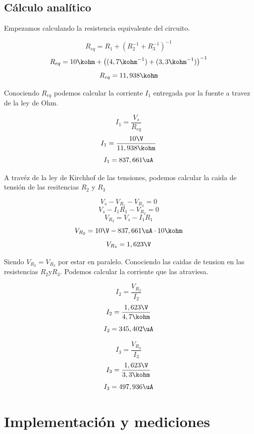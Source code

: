 \documentclass[]{informeutn}
\begin{document}
\section{Cálculo analítico}
Empezamos calculando la resistencia equivalente del circuito.

$$R_{eq} = R_1 + \left(R_2^{-1}+R_3^{-1}\right)^{-1}$$
$$R_{eq} = 10\kohm + \left((4,7\kohm^{-1})+(3,3\kohm^{-1})\right)^{-1}$$
$$R_{eq} = 11,938\kohm$$

Conociendo $R_{eq}$ podemos calcular la corriente $I_1$ entregada por la fuente a travez de la ley de Ohm.

$$I_1=\frac{V_s}{R_{eq}}$$
$$I_1=\frac{10\V}{11,938\kohm}$$
$$I_1=837,661\uA$$

A travéz de la ley de Kirchhof de las tensiones, podemos calcular la caida de tensión de las resitencias $R_2$ y $R_3$

$$V_s - V_{R_1} - V_{R_2} = 0$$
$$V_s - I_1R_1 - V_{R_2} = 0$$
$$V_{R_2} = V_s - I_1R_1$$
$$V_{R_2} = 10\V - 837,661\uA \cdot 10\kohm$$
$$V_{R_2} = 1,623\V$$

Siendo $V_{R_2}=V_{R_3}$ por estar en paralelo.
Conociendo las caidas de tension en las resistencias $R_2$y$R_3$. Podemos calcular la corriente que las atraviesa.

\noindent
\begin{minipage}[][][t]{0.5 \textwidth}
  \vspace*{9pt}
  $$I_2=\frac{V_{R_2}}{I_2}$$
  $$I_2=\frac{1,623\V}{4,7\kohm}$$
  $$I_2=345,402\uA$$
  \vspace*{1pt}
\end{minipage}
\begin{minipage}[][][t]{0.5 \textwidth}
  \vspace*{9pt}
  $$I_3=\frac{V_{R_3}}{I_3}$$
  $$I_3=\frac{1,623\V}{3,3\kohm}$$
  $$I_3=497,936\uA$$
  \vspace*{1pt}
\end{minipage}

%

\chapter{Implementación y mediciones}
\end{document}
